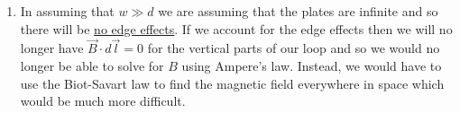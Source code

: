 {\begin{enumerate}
    \begin{center}
    \end{center}
    And so we get that the magnetic field is
    \[\vec{B}=-\mu_0\sigma v\hat{i}\]
    between the plates and zero everywhere else.
    \item In assuming that $w\gg d$ we are assuming that the plates are infinite and so there will be \underline{no edge effects}. If we account for the edge effects then we will no longer have $\vec{B}\cdot d\vec{l}=0$ for the vertical parts of our loop and so we would no longer be able to solve for $B$ using Ampere's law. Instead, we would have to use the Biot-Savart law to find the magnetic field everywhere in space which would be much more difficult.
\end{enumerate}

}{}